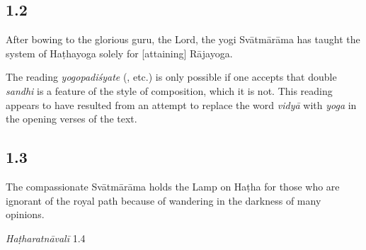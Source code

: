 \begin{ekdosis}
\begin{philcomm}[hp01_001]
\end{philcomm}

\subsection*{1.2}
\begin{translation}[hp01_002]
After bowing to the glorious guru, the Lord, the yogi Svātmārāma has taught the system of Haṭhayoga solely for [attaining] Rājayoga.
\end{translation}

\begin{philcomm}[hp01_002]
The reading \emph{yogopadiśyate} (, etc.) is only possible if one accepts that double \emph{sandhi} is a feature of the style of composition, which it is not. This reading appears to have resulted from an attempt to replace the word \emph{vidyā} with \emph{yoga} in the opening verses of the text.%
\end{philcomm}

\subsection*{1.3}
\begin{translation}[hp01_003]
The compassionate Svātmārāma holds the Lamp on Haṭha for those who are ignorant of the royal path because of wandering in the darkness of many opinions.%
\end{translation}

\begin{testimonia}[hp01_003]
\emph{Haṭharatnāvalī} 1.4

\begin{versinnote}
\tl{\var{rājayogam ] rājamārgam P,T,t1}\\!}
\end{versinnote}

\end{testimonia}


\end{ekdosis}

